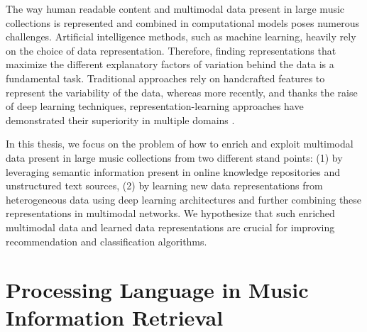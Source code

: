 The way human readable content and multimodal data present in large music collections is represented and combined in computational models poses numerous challenges. Artificial intelligence methods, such as machine learning, heavily rely on the choice of data representation. Therefore, finding representations that maximize the different explanatory factors of variation behind the data is a fundamental task. Traditional approaches rely on handcrafted features to represent the variability of the data, whereas more recently, and thanks the raise of deep learning techniques, representation-learning approaches have demonstrated their superiority in multiple domains \citep{bengio2013representation}.

In this thesis, we focus on the problem of how to enrich and exploit multimodal data present in large music collections from two different stand points: (1) by leveraging semantic information present in online knowledge repositories and unstructured text sources, (2) by learning new data representations from heterogeneous data using deep learning architectures and further combining these representations in multimodal networks. %
We hypothesize that such enriched multimodal data and learned data representations are crucial for improving recommendation and classification algorithms. %


\section{Processing Language in Music Information Retrieval}
\label{sec:intro:nlp}

